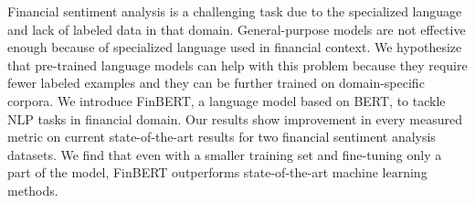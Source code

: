 \documentclass[../main.tex]{subfiles}
\begin{document}
    Financial sentiment analysis is a challenging task due to the specialized language and lack of labeled data in that domain. General-purpose models are not effective enough because of specialized language used in financial context. We hypothesize that pre-trained language models can help with this problem because they require fewer labeled examples and they can be further trained on domain-specific corpora. We introduce FinBERT, a language model based on BERT, to tackle NLP tasks in financial domain. Our results show improvement in every measured metric on current state-of-the-art results for two financial sentiment analysis datasets. We find that even with a smaller training set and fine-tuning only a part of the model, FinBERT outperforms state-of-the-art machine learning methods.
\end{document}
